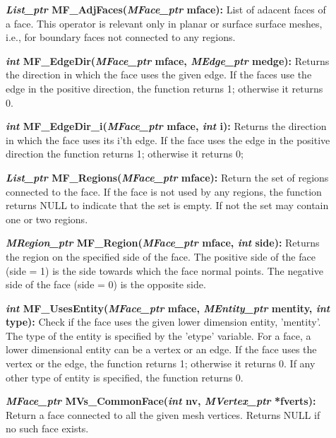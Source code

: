 \documentclass[12pt]{article}
\begin{document}
\begin{description}
\item[]\textbf{\textit{List\_ptr} MF\_AdjFaces(\textit{MFace\_ptr} mface):}
List of adacent faces of a face. This operator is relevant only in
planar or surface surface meshes, i.e., for boundary faces not
connected to any regions.

\item[]\textbf{\textit{int} MF\_EdgeDir(\textit{MFace\_ptr} mface,
\textit{MEdge\_ptr} medge):} Returns the direction in which the face
uses the given edge. If the faces use the edge in the positive direction,
the function returns 1; otherwise it returns 0.

\item[]\textbf{\textit{int} MF\_EdgeDir\_i(\textit{MFace\_ptr} mface,
\textit{int} i):} Returns the direction in which the face uses its i'th
edge. If the face uses the edge in the positive direction the function
returns 1; otherwise it returns 0;

\item[]\textbf{\textit{List\_ptr} MF\_Regions(\textit{MFace\_ptr} mface):}
Return the set of regions connected to the face. If the face is not
used by any regions, the function returns NULL to indicate that the
set is empty. If not the set may contain one or two regions.

\item[]\textbf{\textit{MRegion\_ptr} MF\_Region(\textit{MFace\_ptr} mface,
\textit{int} side):} Returns the region on the specified side of the
face. The positive side of the face (side = 1) is the side towards
which the face normal points. The negative side of the face (side = 0)
is the opposite side.

\item[]

\item[]\textbf{\textit{int} MF\_UsesEntity(\textit{MFace\_ptr} mface,
\textit{MEntity\_ptr} mentity, \textit{int} type):} Check if the face
uses the given lower dimension entity, 'mentity'. The type of the
entity is specified by the 'etype' variable. For a face, a lower
dimensional entity can be a vertex or an edge. If the face uses the
vertex or the edge, the function returns 1; otherwise it returns 0. If
any other type of entity is specified, the function returns 0.

\item[]\textbf{\textit{MFace\_ptr} MVs\_CommonFace(\textit{int} nv,
    \textit{MVertex\_ptr} *fverts):} Return a face connected to all
  the given mesh vertices. Returns NULL if no such face exists.


\end{description}
\end{document}
